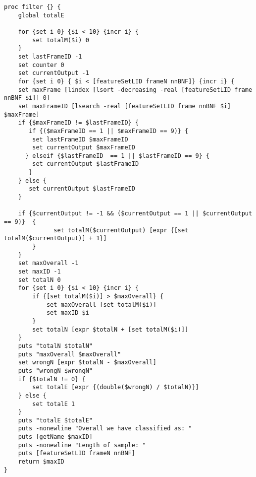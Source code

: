 \begin{lstlisting}[label=lst:2LFilter,caption=2-Language Filter (For DE/EN) employed to smooth/improve output]
proc filter {} {
    global totalE

    for {set i 0} {$i < 10} {incr i} {
        set totalM($i) 0
    }
    set lastFrameID -1
    set counter 0
    set currentOutput -1
    for {set i 0} { $i < [featureSetLID frameN nnBNF]} {incr i} {
    set maxFrame [lindex [lsort -decreasing -real [featureSetLID frame nnBNF $i]] 0]
    set maxFrameID [lsearch -real [featureSetLID frame nnBNF $i] $maxFrame]
    if {$maxFrameID != $lastFrameID} {
       if {($maxFrameID == 1 || $maxFrameID == 9)} {
        set lastFrameID $maxFrameID
        set currentOutput $maxFrameID
      } elseif {$lastFrameID  == 1 || $lastFrameID == 9} {
        set currentOutput $lastFrameID
       }
    } else {
       set currentOutput $lastFrameID
    }

    if {$currentOutput != -1 && ($currentOutput == 1 || $currentOutput == 9)}  {
              set totalM($currentOutput) [expr {[set totalM($currentOutput)] + 1}]
        }
    }
    set maxOverall -1
    set maxID -1
    set totalN 0
    for {set i 0} {$i < 10} {incr i} {
        if {[set totalM($i)] > $maxOverall} {
            set maxOverall [set totalM($i)]
            set maxID $i
        }
        set totalN [expr $totalN + [set totalM($i)]]
    }
    puts "totalN $totalN"
    puts "maxOverall $maxOverall"
    set wrongN [expr $totalN - $maxOverall]
    puts "wrongN $wrongN"
    if {$totalN != 0} {
        set totalE [expr {(double($wrongN) / $totalN)}]
    } else {
        set totalE 1
    }
    puts "totalE $totalE"
    puts -nonewline "Overall we have classified as: "
    puts [getName $maxID]
    puts -nonewline "Length of sample: "
    puts [featureSetLID frameN nnBNF]
    return $maxID
}
\end{lstlisting}
\newpage

